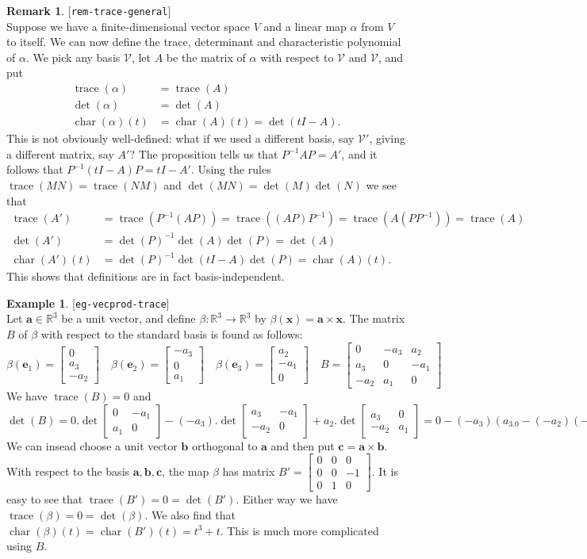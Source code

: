\documentclass{amsart}
\newcommand{\lbl}[1]{\label{#1}\textup{[\texttt{#1}]}\ \\}
\newcommand{\lbl}{\label}
\newcommand{\R}         {{\mathbb{R}}}
\newcommand{\trc}       {\operatorname{trace}}
\newcommand{\chr}       {\operatorname{char}}
\newcommand{\bsm}       {\left[\begin{smallmatrix}}
\newcommand{\esm}       {\end{smallmatrix}\right]}
\newcommand{\al}        {\alpha}
\newcommand{\bt}        {\beta}
\newcommand{\tm}        {\times}
\newcommand{\xra}       {\xrightarrow}
\newcommand{\va}        {\mathbf{a}}
\newcommand{\vb}        {\mathbf{b}}
\newcommand{\vc}        {\mathbf{c}}
\newcommand{\ve}        {\mathbf{e}}
\newcommand{\vx}        {\mathbf{x}}
\newcommand{\CV}        {{\mathcal{V}}}
\renewcommand{\:}       {\colon}
\theoremstyle{definition}
\newtheorem{remark}[theorem]{Remark}
\newtheorem{example}[theorem]{Example}
\begin{document}
\begin{remark}\lbl{rem-trace-general}
 Suppose we have a finite-dimensional vector space $V$ and a
 linear map $\al$ from $V$ to itself.  We can now define the
 trace, determinant and characteristic polynomial of $\al$.
 We pick any basis $\CV$, let $A$ be the matrix of $\al$
 with respect to $\CV$ and $\CV$, and put
 \begin{align*}
  \trc(\al) &= \trc(A) \\
  \det(\al)   &= \det(A) \\
  \chr(\al)(t) &= \chr(A)(t) = \det(tI-A).
 \end{align*}
 This is not obviously well-defined: what if we used a
 different basis, say $\CV'$, giving a different matrix, say
 $A'$?  The proposition tells us that $P^{-1}AP=A'$, and it
 follows that $P^{-1}(tI-A)P=tI-A'$.  Using the rules
 $\trc(MN)=\trc(NM)$ and $\det(MN)=\det(M)\det(N)$ we
 see that 
 \begin{align*}
  \trc(A') &= \trc(P^{-1}(AP)) = \trc((AP)P^{-1}) = 
                \trc(A(PP^{-1})) = \trc(A) \\
  \det(A') &= \det(P)^{-1}\det(A)\det(P) = \det(A) \\
  \chr(A')(t) &= \det(P)^{-1}\det(tI-A)\det(P) = \chr(A)(t).
 \end{align*}
 This shows that definitions are in fact basis-independent.
\end{remark}

\begin{example}\lbl{eg-vecprod-trace}
 Let $\va\in\R^3$ be a unit vector, and define
 $\bt\:\R^3\xra{}\R^3$ by $\bt(\vx)=\va\tm\vx$.  {The
 matrix $B$ of $\bt$ with respect to the standard basis is 
 found as follows: 
 \[ \bt(\ve_1)=\bsm 0\\ a_3\\-a_2\esm\hspace{1em}
    \bt(\ve_2)=\bsm -a_3\\0\\ a_1\esm\hspace{1em}
    \bt(\ve_3)=\bsm a_2\\-a_1\\ 0\esm\hspace{1em}
    B = \bsm 0&-a_3&a_2 \\ a_3&0&-a_1\\ -a_2&a_1&0\esm
 \]}
 {We have $\trc(B)=0$ and 
 {\tiny \[\det(B) = 
     0.\det\bsm 0&-a_1\\ a_1&0\esm -
     (-a_3).\det\bsm a_3&-a_1\\ -a_2&0\esm +
     a_2.\det\bsm a_3&0\\ -a_2&a_1\esm =
     0-(-a_3)(a_3.0-(-a_2)(-a_1))+
     a_2(a_3a_1-0.(-a_2)) = 0
 \]}}
 {We can insead choose a unit vector $\vb$ orthogonal
 to $\va$ and then put $\vc=\va\tm\vb$.}{  With respect to the
 basis $\va,\vb,\vc$, the map $\bt$ has matrix
 $B'=\bsm 0&0&0\\0&0&-1\\0&1&0\esm$.}{  It is easy to see that
 $\trc(B')=0=\det(B')$.}{  Either way we have
 $\trc(\bt)=0=\det(\bt)$.}{  We also find that
 $\chr(\bt)(t)=\chr(B')(t)=t^3+t$.}{  This is much more
 complicated using $B$.}
\end{example}
\end{document}
